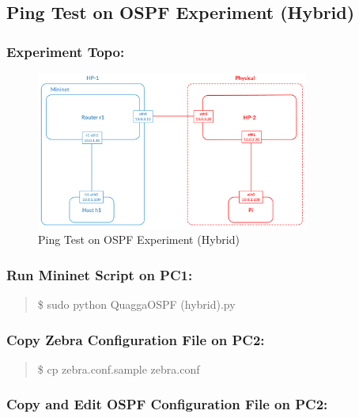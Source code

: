 \subsection{Ping Test on OSPF Experiment (Hybrid)}\label{run-ospf-experiment-hybrid}

\subsubsection{Experiment Topo:}\label{experiment-topo-1}

\begin{figure}[h]
\centering
\includegraphics[width=0.8\textwidth]{./Figure/Topo/Exp2.png}
\caption{Ping Test on OSPF Experiment (Hybrid) \label{fig:Exp2}}
\end{figure}

\subsubsection{Run Mininet Script on PC1:}\label{run-mininet-script-on-pc1}

\begin{quote}
\$ sudo python QuaggaOSPF (hybrid).py
\end{quote}

\subsubsection{Copy Zebra Configuration File on
PC2:}\label{copy-zebra-configuration-file-on-pc2}

\begin{quote}
\$ cp zebra.conf.sample zebra.conf
\end{quote}

\subsubsection{Copy and Edit OSPF Configuration File on
PC2:}\label{copy-and-edit-ospf-configuration-file-on-pc2}

